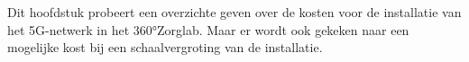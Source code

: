 \chapter{}%
\label{ch:financieel}


Dit hoofdstuk probeert een overzichte geven over de kosten voor de installatie van het 5G-netwerk in het 360°Zorglab. Maar er wordt ook gekeken naar een mogelijke kost bij een schaalvergroting van de installatie.

